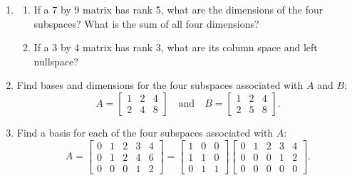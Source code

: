 \documentclass[14pt, a4paper]{article}
\begin{document}
\begin{enumerate}
    \item
          \begin{enumerate}
              \item If a 7 by 9 matrix has rank 5, what are the dimensions of the four subspaces? What is the sum of all four dimensions?
              \item If a 3 by 4 matrix has rank 3, what are its column space and left nullspace?
          \end{enumerate}

    \item Find bases and dimensions for the four subspaces associated with $A$ and $B$:
          \[
              A = \begin{bmatrix} 1 & 2 & 4 \\ 2 & 4 & 8 \end{bmatrix} \quad \text{and} \quad
              B = \begin{bmatrix} 1 & 2 & 4 \\ 2 & 5 & 8 \end{bmatrix}.
          \]

    \item Find a basis for each of the four subspaces associated with $A$:
          \[
              A = \begin{bmatrix} 0 & 1 & 2 & 3 & 4 \\ 0 & 1 & 2 & 4 & 6 \\ 0 & 0 & 0 & 1 & 2 \end{bmatrix}
              = \begin{bmatrix} 1 & 0 & 0 \\ 1 & 1 & 0 \\ 0 & 1 & 1 \end{bmatrix}
              \begin{bmatrix} 0 & 1 & 2 & 3 & 4 \\ 0 & 0 & 0 & 1 & 2 \\ 0 & 0 & 0 & 0 & 0 \end{bmatrix}.
          \]


\end{enumerate}
\end{document}
